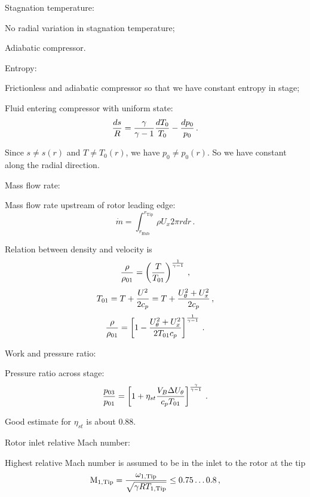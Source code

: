 \begin{enumeratePacked}
\item Stagnation temperature:
  \begin{itemizePacked}
  \item No radial variation in stagnation temperature;
  \item Adiabatic compressor.
  \end{itemizePacked}
\item Entropy:
  \begin{itemizePacked}
  \item Frictionless and adiabatic compressor so that we have constant entropy in stage;
  \item Fluid entering compressor with uniform state:
    \[
      {\frac{ds}{R}} = {\frac{\gamma}{\gamma-1}} {\frac{dT_0}{T_0}} - {\frac{dp_0}{p_0}}\,.
    \]
  \end{itemizePacked}
  Since $s \neq s(r)$ and $T \neq T_0(r)$, we have $p_0 \neq p_0(r)$. So we have constant along the radial direction.
\item Mass flow rate:
  \begin{itemizePacked}
  \item Mass flow rate upstream of rotor leading edge:
    \[
      \dot{m} = \int_{r_\text{Hub}}^{r_\text{Tip}} \rho U_x 2 \pi r dr\,.
    \]
  \item Relation between density and velocity is
    \[
      {\frac{\rho}{\rho_{01}}} = \left({\frac{T}{T_{01}}}\right)^{\frac{1}{\gamma-1}} \,,
    \]
    \[
      T_{01} = T + {\frac{U^2}{2 c_p}} = T + {\frac{U_\theta^2 + U_x^2}{2 c_p}}\,,
    \]
    \[
      {\frac{\rho}{\rho_{01}}} = \left[1- {\frac{U_\theta^2 + U_x^2}{2 T_{01} c_p}}\right]^{\frac{1}{\gamma-1}}\,.
    \]
  \end{itemizePacked}
\item Work and pressure ratio:
  \begin{itemizePacked}
  \item Pressure ratio across stage:
    \[
      {\frac{p_{03}}{p_{01}}} = \left[ 1+\eta_{st} {\frac{V_B \Delta U_\theta}{c_p T_{01}}} \right]^{\frac{\gamma}{\gamma-1}}\,.
    \]
  \item Good estimate for $\eta_{st}$ is about 0.88.
  \end{itemizePacked}
\item Rotor inlet relative Mach number:
  \begin{itemizePacked}
  \item Highest relative Mach number is assumed to be in the inlet to the rotor at the tip
    \[
      \text{M}_{1,\text{Tip}} = {\frac{\omega_{1,\text{Tip}}}{\sqrt{\gamma R T_{1,\text{Tip}}}}} \le 0.75 \dots 0.8\,,
\]
\end{itemizePacked}
\end{enumeratePacked}
